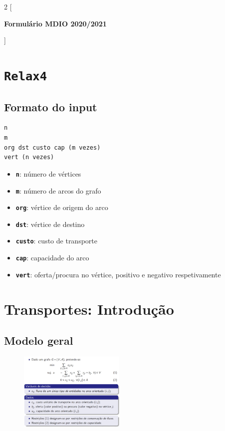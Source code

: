 \documentclass[10pt, a4paper]{article}
\begin{document}
 
\begin{multicols}{2}
[
    \begin{center}
        \textbf{\Large Formulário MDIO 2020/2021}
    \end{center}
]

\thispagestyle{empty}



\section{\texttt{Relax4}}

\subsection{Formato do input}

\begin{lstlisting}
n
m
org dst custo cap (m vezes)
vert (n vezes)
\end{lstlisting}

\begin{itemize}
    \item \textbf{\texttt{n}}: número de vértices
    \item \textbf{\texttt{m}}: número de arcos do grafo
    \item \textbf{\texttt{org}}: vértice de origem do arco
    \item \textbf{\texttt{dst}}: vértice de destino
    \item \textbf{\texttt{custo}}: custo de transporte
    \item \textbf{\texttt{cap}}: capacidade do arco
    \item \textbf{\texttt{vert}}: oferta/procura no vértice, positivo e negativo respetivamente
\end{itemize}



\section{Transportes: Introdução}

\subsection{Modelo geral}

\begin{figure}[H]
    \centering
    \includegraphics[width=0.45\textwidth]{modelo_geral_transportes.png}
\end{figure}


\end{multicols}
\end{document}
